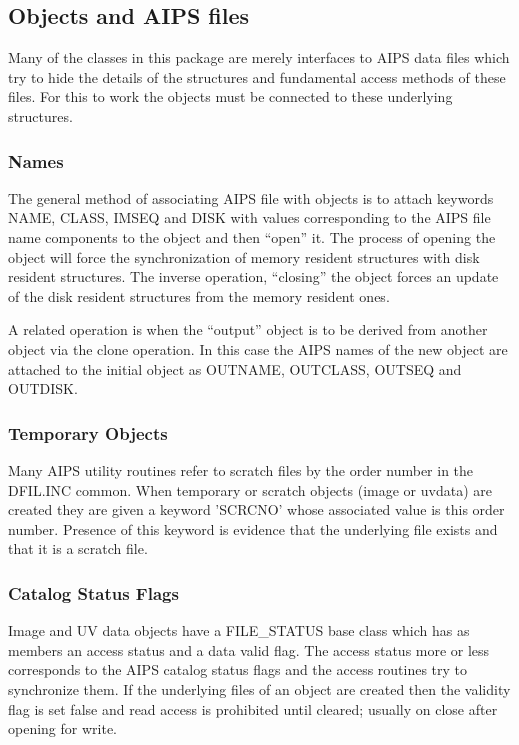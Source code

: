 \subsection{Objects and AIPS files}

   Many of the classes in this package are merely interfaces to AIPS
data files which try to hide the details of the structures and
fundamental access methods of these files.  For this to work the
objects must be connected to these underlying structures.

\subsubsection {Names}

   The general method of associating AIPS file with objects is to
attach keywords NAME, CLASS, IMSEQ and DISK with values corresponding
to the AIPS file name components to the object and then
``open'' it.  The process of opening the object will force the
synchronization of memory resident structures with disk resident
structures.  The inverse operation, ``closing'' the object forces an
update of the disk resident structures from the memory resident ones.

   A related operation is when the ``output'' object is to be derived
from another object via the clone operation.  In this case the AIPS
names of the new object are attached to the initial object as OUTNAME,
OUTCLASS, OUTSEQ and OUTDISK.

\subsubsection {Temporary Objects}

   Many AIPS utility routines refer to scratch files by the order
number in the DFIL.INC common.  When temporary or scratch objects
(image or uvdata) are created they are given a keyword 'SCRCNO' whose
associated value is this order number.  Presence of this keyword is
evidence that the underlying file exists and that it is a scratch file.


\subsubsection {Catalog Status Flags}

   Image and UV data objects have a FILE\_STATUS base class which has
as members an access status and a data valid flag.  The access status
more or less corresponds to the AIPS catalog status flags and the
access routines try to synchronize them.  If the underlying files of
an object are created then the validity flag is set false and read
access is prohibited until cleared; usually on close after opening for
write.

